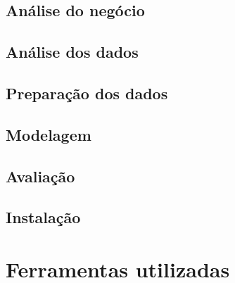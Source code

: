 \subsection*{Análise do negócio}
\subsection*{Análise dos dados}
\subsection*{Preparação dos dados}
\subsection*{Modelagem}
\subsection*{Avaliação}
\subsection*{Instalação}

\section{Ferramentas utilizadas}